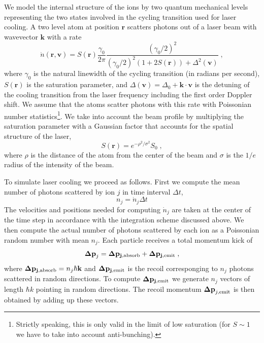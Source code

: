 \documentclass[
  aps,
  reprint,
  twoside,
  showpacs,
  amsmath,
  amssymb,
  floatfix
]{revtex4-1}
\begin{document}
We model the internal structure of the ions by two quantum mechanical
levels representing the two states involved in the cycling transition
used for laser cooling.  A two level atom at position $\mathbf{r}$
scatters photons out of a laser beam with wavevector $\mathbf{k}$ with a
rate
\begin{equation}
\dot n (\mathbf{r}, \mathbf{v}) = 
S(\mathbf{r})\frac{\gamma_0}{2\pi}
\frac{(\gamma_0/2)^2}{(\gamma_0/2)^2(1+2S(\mathbf{r}))+\Delta^2(\mathbf{v})}\;,
\end{equation}
where $\gamma_0$ is the natural linewidth of the cycling transition (in
radians per second), $S(\mathbf{r})$ is the saturation parameter, and
$\Delta(\mathbf{v})=\Delta_0 + \mathbf{k}\cdot\mathbf{v}$ is the
detuning of the cooling transition from the laser frequency including
the first order Doppler shift.  We assume that the atoms scatter photons
with this rate with Poissonian number statistics\footnote{Strictly
speaking, this is only valid in the limit of low saturation (for
$S\sim 1$ we have to take into account anti-bunching).}.  We take into
account the beam profile by multiplying the saturation parameter with a
Gaussian factor that accounts for the spatial structure of the laser,
\begin{equation}
S(\mathbf{r})=e^{-\rho^2/\sigma^2}S_0\;,
\end{equation}
where $\rho$ is the distance of the atom from the center of the beam and
$\sigma$ is the $1/e$ radius of the intensity of the beam.

To simulate laser cooling we proceed as follows.  First we compute the
mean number of photons scattered by ion $j$ in time interval $\Delta t$,
\begin{equation}
n_j=\dot{n}_j \Delta t
\end{equation}
The velocities and positions needed for computing $\dot{n}_j$ are taken
at the center of the time step in accordance with the integration scheme
discussed above.  We then compute the actual number of photons scattered
by each ion as a Poissonian random number with mean $n_j$.  Each
particle receives a total momentum kick of 
\begin{equation}
\mathbf{\Delta p}_j = \mathbf{\Delta p_{j,{\rm absorb}}} + 
\mathbf{\Delta p_{j,{\rm emit}}}\;,
\end{equation}
where $\mathbf{\Delta p_{j,{\rm absorb}}}=n_j \hbar \mathbf{k}$ and
$\mathbf{\Delta p_{j,{\rm emit}}}$ is the recoil corresponging to $n_j$
photons scattered in random directions.  To compute $\mathbf{\Delta
p_{j,{\rm emit}}}$ we generate $n_j$ vectors of length $\hbar k$
pointing in random directions.  The recoil momentum $\mathbf{\Delta
p}_{j,{\rm emit}}$ is then obtained by adding up these vectors.
\end{document}
